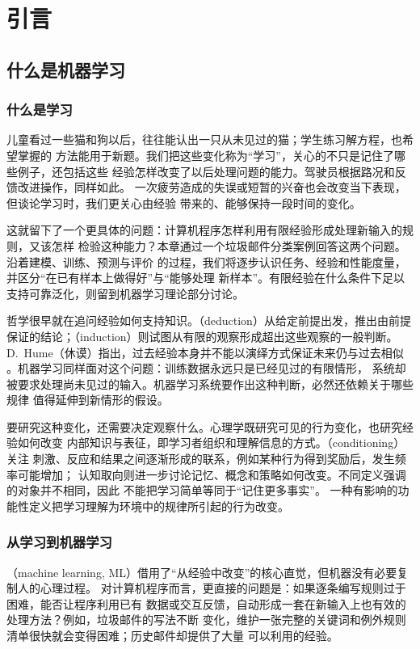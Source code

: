 \chapter{引言}
\label{chap:introduction}

\section{什么是机器学习}
\label{sec:what-is-machine-learning}

\subsection{什么是学习}

儿童看过一些猫和狗以后，往往能认出一只从未见过的猫；学生练习解方程，也希望掌握的
方法能用于新题。我们把这些变化称为“学习”，关心的不只是记住了哪些例子，还包括这些
经验怎样改变了以后处理问题的能力。驾驶员根据路况和反馈改进操作，同样如此。
一次疲劳造成的失误或短暂的兴奋也会改变当下表现，但谈论学习时，我们更关心由经验
带来的、能够保持一段时间的变化。

这就留下了一个更具体的问题：计算机程序怎样利用有限经验形成处理新输入的规则，又该怎样
检验这种能力？本章通过一个垃圾邮件分类案例回答这两个问题。沿着建模、训练、预测与评价
的过程，我们将逐步认识任务、经验和性能度量，并区分“在已有样本上做得好”与“能够处理
新样本”。有限经验在什么条件下足以支持可靠泛化，则留到机器学习理论部分讨论。

哲学很早就在追问经验如何支持知识。（deduction）从给定前提出发，推出由前提
保证的结论；（induction）则试图从有限的观察形成超出这些观察的一般判断。
D.~Hume（休谟）指出，过去经验本身并不能以演绎方式保证未来仍与过去相似
。机器学习同样面对这个问题：训练数据永远只是已经见过的有限情形，
系统却被要求处理尚未见过的输入。机器学习系统要作出这种判断，必然还依赖关于哪些规律
值得延伸到新情形的假设。

要研究这种变化，还需要决定观察什么。心理学既研究可见的行为变化，也研究经验如何改变
内部知识与表征，即学习者组织和理解信息的方式。（conditioning）关注
刺激、反应和结果之间逐渐形成的联系，例如某种行为得到奖励后，发生频率可能增加；
认知取向则进一步讨论记忆、概念和策略如何改变。不同定义强调的对象并不相同，因此
不能把学习简单等同于“记住更多事实”。
一种有影响的功能性定义把学习理解为环境中的规律所引起的行为改变。

\subsection{从学习到机器学习}
（machine learning, ML）借用了“从经验中改变”的核心直觉，但机器没有必要复制人的心理过程。
对计算机程序而言，更直接的问题是：如果逐条编写规则过于困难，能否让程序利用已有
数据或交互反馈，自动形成一套在新输入上也有效的处理方法？例如，垃圾邮件的写法不断
变化，维护一张完整的关键词和例外规则清单很快就会变得困难；历史邮件却提供了大量
可以利用的经验。

